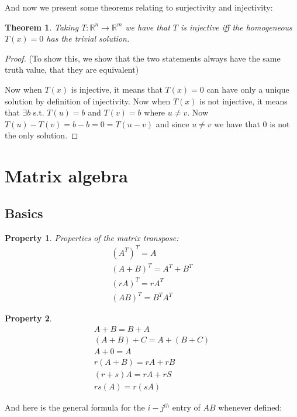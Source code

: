 \documentclass{article}
\newtheorem{thm}{Theorem}[subsection]
\newtheorem{property}{Property}
\numberwithin{equation}{subsection}
\begin{document}
And now we present some theorems relating to surjectivity and injectivity:

\begin{thm}
Taking $T: \mathbb{R}^n \to \mathbb{R}^m$ we have that $T$ is injective iff the homogeneous $T(x) = 0$ has the trivial solution. 
\end{thm}

\begin{proof}(To show this, we show that the two statements always have the same truth value, that they are equivalent)

Now when $T(x)$ is injective, it means that $T(x) = 0$ can have only a unique solution by definition of injectivity. Now when $T(x)$ is not injective, it means that $\exists b$ s.t. $T(u) = b$ and $T(v) = b$ where $u \not = v$. Now $T(u) - T(v) = b-b = 0 = T(u-v)$ and since $u\not=v$ we have that $0$ is not the only solution.
\end{proof}

\section{Matrix algebra}

\subsection{Basics}

\begin{property}
Properties of the matrix transpose:
\begin{align*}
    (A^T)^T = A\\
    (A + B)^T = A^T + B^T\\
    (rA)^T = rA^T\\
    (AB)^T = B^TA^T
\end{align*}
\end{property}



\begin{property}
\begin{align*}
    A + B = B + A\\
    (A + B) + C = A + (B + C)\\
    A + 0 = A\\
    r(A + B) = rA + rB\\
    (r+s)A = rA + rS\\
    rs(A) = r(sA)
\end{align*}
\end{property}

And here is the general formula for the $i-j^{th}$ entry of $AB$ whenever defined:
\end{document}
